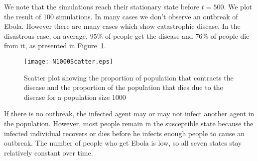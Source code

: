 We note that the simulations reach their stationary state before $t = 500$. We plot the result of 100 simulations. In many cases we don't observe an outbreak of Ebola. However there are many cases which show catastrophic disease. In the disastrous case, on average, 95\% of people get the disease and 76\% of people die from it, as presented in Figure~\ref{fig:Scatter}. 

 
\begin{figure}
\begin{center}
\texttt{[image: N1000Scatter.eps]}
\end{center}
\caption{Scatter plot showing the proportion of population that contracts the disease and the proportion of the population that dies due to the disease for a population size 1000}
\label{fig:Scatter}
\end{figure}


If there is no outbreak, the infected agent may or may not infect another agent in the population. However, most people remain in the  susceptible state because the infected individual recovers or dies before he infects enough people to cause an outbreak. The number of people who get Ebola is low, so all seven states stay relatively constant over time. %


